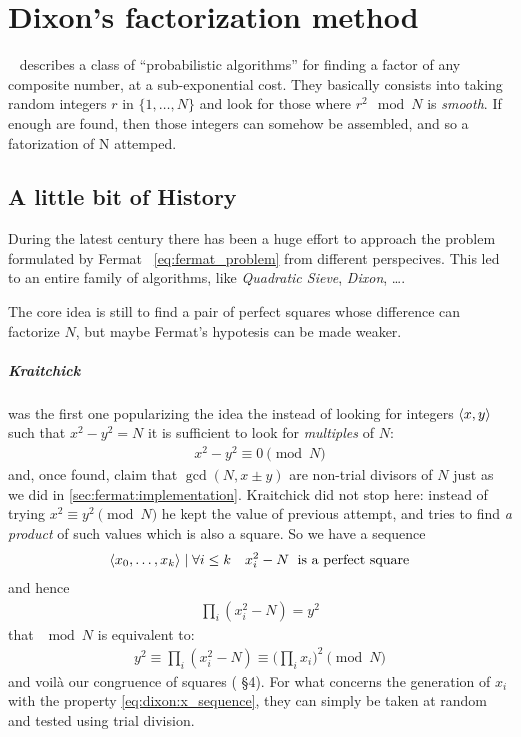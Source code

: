 \chapter{Dixon's factorization method\label{chap:dixon}}

~\cite{dixon} describes a class of ``probabilistic algorithms'' for finding a
factor of any composite number, at a sub-exponential cost. They basically
consists into taking random integers $r$ in $\{1, \ldots, N\}$ and look for those
where $r^2 \mod{N}$ is \emph{smooth}. If enough are found, then those integers
can somehow be assembled, and so a fatorization of N attemped.

\section{A little bit of History \label{sec:dixon:history}}
During the latest century there has been a huge effort to approach the problem
formulated by Fermat ~\ref{eq:fermat_problem} from different perspecives. This
led to an entire family of algorithms, like \emph{Quadratic Sieve},
\emph{Dixon}, \ldots.

The core idea is still to find a pair of perfect squares whose difference can
factorize $N$, but maybe Fermat's hypotesis can be made weaker.

\paragraph{Kraitchick} was the first one popularizing the idea the instead of
looking for integers $\langle x, y\rangle$ such that $x^2 -y^2 = N$ it is sufficient
to look for \emph{multiples} of $N$:
\begin{align}
  x^2 - y^2 \equiv 0 \pmod{N}
\end{align}
and, once found, claim that $\gcd(N, x \pm y)$ are non-trial divisors of $N$
just as we did in \ref{sec:fermat:implementation}.
Kraitchick did not stop here: instead of trying $x^2 \equiv y^2 \pmod{N}$ he
kept the value of previous attempt, and tries to find \emph{a product} of such
values which is also a square. So we have a sequence
\begin{align}
  \label{eq:dixon:x_sequence}
  \langle x_0, \ldots, x_k\rangle \mid \forall i \leq k \quad x_i^2 - N
  \; \text{ is a perfect square}
\end{align}
and hence
\begin{align*}
  \prod_i (x_i^2 - N) = y^2
\end{align*}
that $\mod{N}$ is equivalent to:
\begin{align}
  \label{eq:dixon:fermat_revisited}
  y^2 \equiv \prod_i (x_i^2 - N) \equiv \big( \prod_i x_i \big) ^2 \pmod{N}
\end{align}
and voil\`a our congruence of squares (\cite{discretelogs} \S 4). For what
concerns the generation of $x_i$ with the property \ref{eq:dixon:x_sequence},
they can simply be taken at random and tested using trial division.

